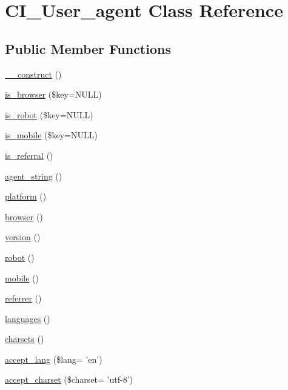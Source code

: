 \hypertarget{class_c_i___user__agent}{\section{C\-I\-\_\-\-User\-\_\-agent Class Reference}
\label{class_c_i___user__agent}
}
\subsection*{Public Member Functions}
\begin{DoxyCompactItemize}
\item 
\hyperlink{class_c_i___user__agent_a095c5d389db211932136b53f25f39685}{\-\_\-\-\_\-construct} ()
\item 
\hyperlink{class_c_i___user__agent_a3a0c84a9f4a781e53c7529af8a5075ae}{is\-\_\-browser} (\$key=N\-U\-L\-L)
\item 
\hyperlink{class_c_i___user__agent_aaf9eed8184635473476a24f6a850815c}{is\-\_\-robot} (\$key=N\-U\-L\-L)
\item 
\hyperlink{class_c_i___user__agent_ab0ec0b7f6a5eeaf00e35743c25e68dfe}{is\-\_\-mobile} (\$key=N\-U\-L\-L)
\item 
\hyperlink{class_c_i___user__agent_ab2ec679c069f45c4265dade1e1097f17}{is\-\_\-referral} ()
\item 
\hyperlink{class_c_i___user__agent_a2a75d1ec3cf3f59cdcae64f6afbc8a1b}{agent\-\_\-string} ()
\item 
\hyperlink{class_c_i___user__agent_ad69bddb2ba31b27415484b3da4213ba8}{platform} ()
\item 
\hyperlink{class_c_i___user__agent_a7dbfb19bfe0682921dcfad5de8dc987c}{browser} ()
\item 
\hyperlink{class_c_i___user__agent_a6080dae0886626b9a4cedb29240708b1}{version} ()
\item 
\hyperlink{class_c_i___user__agent_a4d6a9230d82ec6fc2fdd6bc57f4da5e5}{robot} ()
\item 
\hyperlink{class_c_i___user__agent_a8e13f70e084cbb413d7b68805f3b09dd}{mobile} ()
\item 
\hyperlink{class_c_i___user__agent_a3a7bdecfe4516d7ce790734ae1449d29}{referrer} ()
\item 
\hyperlink{class_c_i___user__agent_adda8fc15b6fe0efc05a50d2645189c77}{languages} ()
\item 
\hyperlink{class_c_i___user__agent_a1c3819a3fa2777b0b0f2c8ab5d97d833}{charsets} ()
\item 
\hyperlink{class_c_i___user__agent_af6634c0f7064ab2530a59986e224161a}{accept\-\_\-lang} (\$lang= 'en')
\item 
\hyperlink{class_c_i___user__agent_a42ef25d6a086c15f1d0b42409c9e157f}{accept\-\_\-charset} (\$charset= 'utf-\/8')
\end{DoxyCompactItemize}
